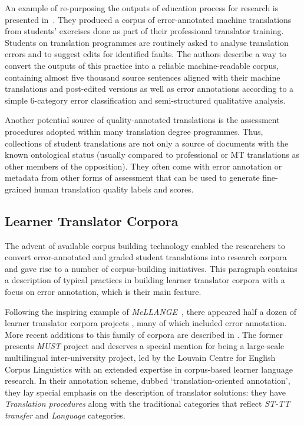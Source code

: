 An example of re-purposing the outputs of education process for research is presented in~\citet{Wisniewski2014}. They produced a corpus of error-annotated machine translations from students' exercises done as part of their professional translator training. Students on translation programmes are routinely asked to analyse translation errors and to suggest edits for identified faults. The authors describe a way to convert the outputs of this practice into a reliable machine-readable corpus, containing almost five thousand source sentences aligned with their machine translations and post-edited versions as well as error annotations according to a simple 6-category error classification and semi-structured qualitative analysis.

Another potential source of quality-annotated translations is the assessment procedures adopted within many translation degree programmes. Thus, collections of student translations are not only a source of documents with the known ontological status (usually compared to professional or MT translations as other members of the opposition). They often come with error annotation or metadata from other forms of assessment that can be used to generate fine-grained human translation quality labels and scores.

\subsection{\label{ssec:ltc}Learner Translator Corpora}

The advent of available corpus building technology enabled the researchers to convert error-annotated and graded student translations into research corpora and gave rise to a number of corpus-building initiatives.
This paragraph contains a description of typical practices in building learner translator corpora with a focus on error annotation, which is their main feature.

Following the inspiring example of \textit{MeLLANGE}~\cite{Castagnoli2011b}, there appeared half a dozen of learner translator corpora projects \cite{Wurm2013, Lapshinova2013, Stepankova2014, Espunya2014, Kutuzov2014rltc,Fictumova2017}, many of which included error annotation. More recent additions to this family of corpora are described in \citet{Granger2018,Alfuraih2019}. The former presents \textit{MUST} project and deserves a special mention for being a large-scale multilingual inter-university project, led by the Louvain Centre for English Corpus Linguistics with an extended expertise in corpus-based learner language research. In their annotation scheme, dubbed `translation-oriented annotation', they lay special emphasis on the description of translator solutions: they have \textit{Translation procedures} along with the traditional categories that reflect \textit{ST-TT transfer} and \textit{Language} categories. 

